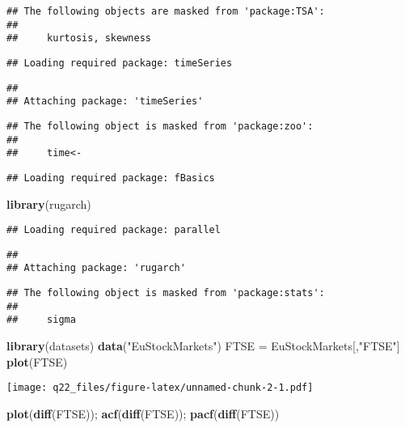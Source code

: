 \documentclass[
]{article}
\newenvironment{Shaded}{\begin{snugshade}}{\end{snugshade}}
\newcommand{\KeywordTok}[1]{\textcolor[rgb]{0.13,0.29,0.53}{\textbf{#1}}}
\newcommand{\NormalTok}[1]{#1}
\newcommand{\StringTok}[1]{\textcolor[rgb]{0.31,0.60,0.02}{#1}}
\begin{document}
\begin{verbatim}
## The following objects are masked from 'package:TSA':
## 
##     kurtosis, skewness
\end{verbatim}

\begin{verbatim}
## Loading required package: timeSeries
\end{verbatim}

\begin{verbatim}
## 
## Attaching package: 'timeSeries'
\end{verbatim}

\begin{verbatim}
## The following object is masked from 'package:zoo':
## 
##     time<-
\end{verbatim}

\begin{verbatim}
## Loading required package: fBasics
\end{verbatim}

\begin{Shaded}
\begin{Highlighting}[]
\KeywordTok{library}\NormalTok{(rugarch)}
\end{Highlighting}
\end{Shaded}

\begin{verbatim}
## Loading required package: parallel
\end{verbatim}

\begin{verbatim}
## 
## Attaching package: 'rugarch'
\end{verbatim}

\begin{verbatim}
## The following object is masked from 'package:stats':
## 
##     sigma
\end{verbatim}

\begin{Shaded}
\begin{Highlighting}[]
\KeywordTok{library}\NormalTok{(datasets)}
\KeywordTok{data}\NormalTok{(}\StringTok{"EuStockMarkets"}\NormalTok{)}
\NormalTok{FTSE =}\StringTok{ }\NormalTok{EuStockMarkets[,}\StringTok{"FTSE"}\NormalTok{]}
\KeywordTok{plot}\NormalTok{(FTSE)}
\end{Highlighting}
\end{Shaded}

\texttt{[image: q22\_files/figure-latex/unnamed-chunk-2-1.pdf]}

\begin{Shaded}
\begin{Highlighting}[]
\KeywordTok{plot}\NormalTok{(}\KeywordTok{diff}\NormalTok{(FTSE)); }\KeywordTok{acf}\NormalTok{(}\KeywordTok{diff}\NormalTok{(FTSE)); }\KeywordTok{pacf}\NormalTok{(}\KeywordTok{diff}\NormalTok{(FTSE))}
\end{Highlighting}
\end{Shaded}
\end{document}
